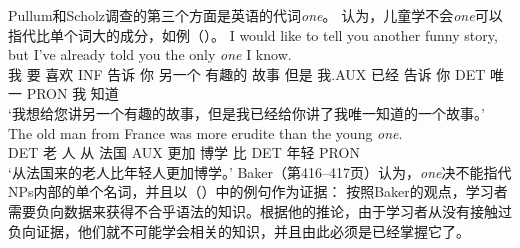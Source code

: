 Pullum和Scholz调查的第三个方面是英语的代词\emph{one}。
\citet[--425, 327--340]{Baker78a-u}认为，儿童学不会\emph{one}可以指代比单个词大的成分，如例（）。
\eal
\ex 
\gll I would like to tell you another funny story, but I've already told you the only \emph{one} I
know.\\
我 要 喜欢 INF 告诉 你 另一个 有趣的 故事 但是 我.AUX 已经 告诉 你 DET 唯一 PRON 我 知道\\
\glt `我想给您讲另一个有趣的故事，但是我已经给你讲了我唯一知道的一个故事。'
\ex 
\gll The old man from France was more erudite than the young \emph{one}.\\
DET 老 人 从 法国 AUX 更加 博学 比 DET 年轻 PRON\\
\glt `从法国来的老人比年轻人更加博学。'
\zl
Baker（第416--417页）认为，\emph{one}决不能指代NPs内部的单个名词，并且以（）中的例句作为证据：
\z
按照Baker的观点，学习者需要负向数据来获得不合乎语法的知识。根据他的推论，由于学习者从没有接触过负向证据，他们就不可能学会相关的知识，并且由此必须是已经掌握它了。

